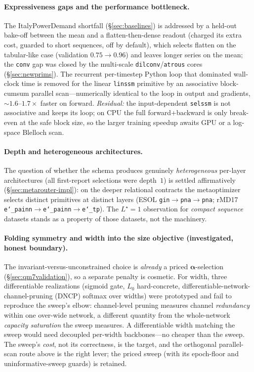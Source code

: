 \documentclass[11pt]{article}
\newcommand{\allowbreakhere}{\discretionary{}{}{}}
\newcommand{\code}[1]{\texttt{\def\_{\char`_\allowbreakhere}#1}}
\newcommand{\alphapar}{\bm{\alpha}}
\begin{document}
\paragraph{Expressiveness gaps and the performance bottleneck.} The ItalyPowerDemand shortfall
(\S\ref{sec:baselines}) is addressed by a held-out bake-off between the mean and a flatten-then-dense readout
(charged its extra cost, guarded to short sequences, off by default), which selects flatten on the
tabular-like case (validation $0.75\to0.96$) and leaves longer series on the mean; the \code{conv} gap was
closed by the multi-scale \code{dilconv}/\code{atrous} cores (\S\ref{sec:newprims}). The recurrent
per-timestep Python loop that dominated wall-clock time is removed for the linear \code{linssm} primitive by
an associative block-cumsum parallel scan---numerically identical to the loop in output and gradients,
$\sim\!1.6\text{--}1.7\times$ faster on forward. \emph{Residual:} the input-dependent \code{selssm} is not
associative and keeps its loop; on CPU the full forward+backward is only break-even at the safe block size,
so the larger training speedup awaits GPU or a log-space Blelloch scan.

\paragraph{Depth and heterogeneous architectures.} The question of whether the schema produces genuinely
\emph{heterogeneous} per-layer architectures (all first-report selections were depth~$1$) is settled
affirmatively (\S\ref{sec:metarouter-impl}): on the deeper relational contracts the metaoptimizer selects
distinct primitives at distinct layers (ESOL \code{gin}$\to$\code{pna}$\to$\code{pna}; rMD17
\code{e\_painn}$\to$\code{e\_painn}$\to$\code{e\_tp}). The $L^\star=1$ observation for \emph{compact
sequence} datasets stands as a property of those datasets, not the machinery.

\paragraph{Folding symmetry and width into the size objective (investigated, honest boundary).} The
invariant-versus-unconstrained choice is \emph{already} a priced $\alphapar$-selection
(\S\ref{sec:qm7validation}), so a separate penalty is cosmetic. For width, three differentiable realizations
(sigmoid gate, $L_0$ hard-concrete, differentiable-network-channel-pruning (DNCP) softmax over widths) were prototyped and fail to reproduce the
sweep's elbow: channel-level pruning measures channel \emph{redundancy} within one over-wide network, a
different quantity from the whole-network \emph{capacity saturation} the sweep measures. A differentiable
width matching the sweep would need decoupled per-width backbones---no cheaper than the sweep. The sweep's
\emph{cost}, not its correctness, is the target, and the orthogonal parallel-scan route above is the right
lever; the priced sweep (with its epoch-floor and uninformative-sweep guards) is retained.
\end{document}
